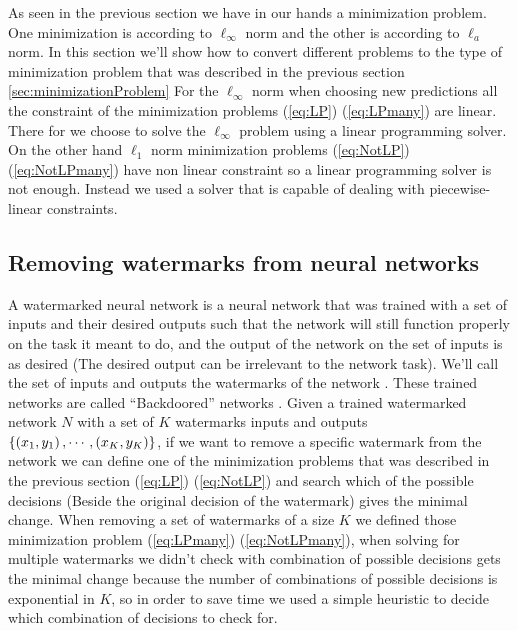 \documentclass{easychair}
\newcommand{\guy}[1]{\marginpar{\textcolor{orange}{Guy: #1}}}
\begin{document}
\guy{In this section, explain how the stuff from section 3 can be
  applied to watermarks and network corrections}

As seen in the previous section we have in our hands a minimization problem. One minimization is according to $\ell_\infty$ norm and the other is according to $\ell_a$ norm. In this section we'll show how to convert different problems to the type of minimization problem that was described in the previous section \ref{sec:minimizationProblem}
For the $\ell_\infty$ norm when choosing new predictions all the constraint of the minimization problems (\ref{eq:LP}) (\ref{eq:LPmany}) are linear. There for we choose to solve the $\ell_\infty$ problem using a linear programming solver.
On the other hand $\ell_1$ norm minimization problems (\ref{eq:NotLP}) (\ref{eq:NotLPmany}) have non linear constraint so a linear programming solver is not enough. Instead we used a solver that is capable of dealing with piecewise-linear constraints. 

\subsection{Removing watermarks from neural networks}
\label{sec:removeWatermarks}
A watermarked neural network is a neural network that was trained with a set of inputs and their desired outputs such that the network will still function properly on the task it meant to do, and the output of the network on the set of inputs is as desired (The desired output can be irrelevant to the network task). We'll call the set of inputs and outputs the watermarks of the network \cite{AdBaPiKeWatermarking}. These trained networks are called ``Backdoored'' networks \cite{GuDoSi17BadNet}.
Given a trained watermarked network $N$ with a set of $K$ watermarks inputs and outputs $\left\lbrace \left(x_1,y_1\right),\cdots,\left(x_K,y_K\right)\right\rbrace$, if we want to remove a specific watermark from the network we can define one of the minimization problems that was described in the previous section (\ref{eq:LP}) (\ref{eq:NotLP}) and search which of the possible decisions (Beside the original decision of the watermark) gives the minimal change.
When removing a set of watermarks of a size $K$ we defined those minimization problem (\ref{eq:LPmany}) (\ref{eq:NotLPmany}), when solving for multiple watermarks we didn't check with combination of possible decisions gets the minimal change because the number of combinations of possible decisions is exponential in $K$, so in order to save time we used a simple heuristic to decide which combination of decisions to check for. 
\end{document}
